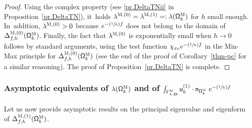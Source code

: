 \documentclass[JEP,XML,SOM,Unicode,NoEqCountersInSection,NoFloatCountersInSection,published]{cedram}
\newcommand{\Psfrac}[2]{(\sfrac{#1}{#2})}
\newcommand{\mbf}[1]{\mathbf{#1}}
\theoremstyle{plain}
\theoremstyle{definition}
\begin{document}
\begin{proof}
Using the complex property (see \eqref{pr.DeltaTNii}
in Proposition~\ref{pr.DeltaTN}), it~holds $\lambda^{\textsc{M},
(0)}=\lambda^{\textsc{M}, (1)}=:\lambda(\mathsf \Omega_k^{\textsc{M}})$ for $h$ small enough. In~addition,
$\lambda^{\textsc{M}, (0)}>0$ because $e^{-\Psfrac 1hf}$ does not belong
to the domain of $\Delta_{f,h}^{\textsc{M},(0)}(\mathsf
\Omega_k^{\textsc{M}})$. Finally, the fact that $\lambda^{\textsc{M}, (0)}$ is exponentially
small when $h\to 0$ follows by standard arguments, using the test
function $\chi_{x_0} e^{-\Psfrac 1hf}$ in the Min-Max principle for
$\Delta_{f,h}^{\textsc{M},(0)}(\mathsf \Omega_k^{\textsc{M}})$ (see
the end of the proof of Corollary~\ref{thm-pc} for a similar reasoning). The proof of Proposition~\ref{pr.DeltaTN} is complete. \end{proof}

\subsubsection{Asymptotic equivalents of $\lambda(\mathsf
\Omega_k^{\textsc{M}})$ and of $\int_{\Gamma_{k,\mbf
D}^{\textsc{M}}}\mathsf u^{(1)}_k \cdot \mathsf n_{ \mathsf
\Omega_k^{\textsc{M}} }\ e^{-\Psfrac 1hf}$}\label{sec.equivM}

Let us now provide asymptotic results on the principal eigenvalue and
eigenform of $ \Delta_{f,h}^{\textsc{M},(1)} (\mathsf \Omega_k^{\textsc{M}}) $.
\end{document}
